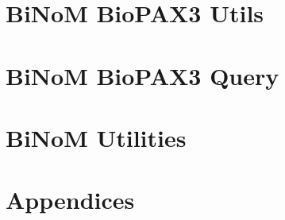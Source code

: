 \documentclass[11pt]{article}
\begin{document}
\section{BiNoM BioPAX3 Utils}

\clearpage

\section{BiNoM BioPAX3 Query}

\clearpage

\section{BiNoM Utilities}

\clearpage

\section{Appendices}


\clearpage


\end{document}
